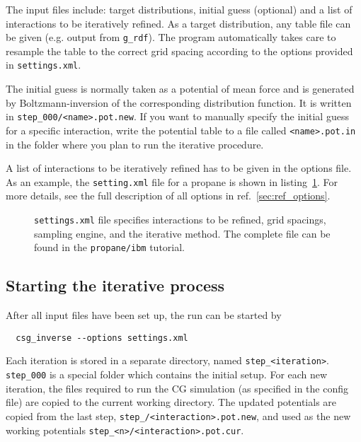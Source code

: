 The input files include: target distributions, initial guess (optional) and a list of interactions to be iteratively refined. As a target distribution, any table file can be given (e.g. \gromacs output from \texttt{g\_rdf}). The program automatically takes care to resample the table to the correct grid spacing according to the options provided in \texttt{settings.xml}.

The initial guess is normally taken as a potential of mean force and is generated by Boltzmann-inversion of the corresponding distribution function. It is written in \texttt{step\_000/<name>.pot.new}. If you want to manually specify the initial guess for a specific interaction, write the potential table to a file called \texttt{<name>.pot.in} in the folder where you plan to run the iterative procedure.

A list of interactions to be iteratively refined has to be given in the options file. As an example, the \texttt{setting.xml} file for a propane is shown in listing~\ref{list:settings}. For more details,  see the full description of all options in ref.~\ref{sec:ref_options}.
\begin{figure}
\centering
\framebox[\textwidth]{
}
\caption{\texttt{settings.xml} file specifies interactions to be refined, grid spacings, sampling engine, and the iterative method. The complete file can be found in the \texttt{propane/ibm} tutorial. 
\label{list:settings}
}
\end{figure}

\subsection{Starting the iterative process}
\label{sec:starting_iterative_process}
After all input files have been set up, the run can be started by
\begin{verbatim}
  csg_inverse --options settings.xml
\end{verbatim}

Each iteration is stored in a separate directory, named \texttt{step\_<iteration>}. \texttt{step\_000} is a special folder which contains the initial setup. For each new iteration, the files required to run the CG simulation (as specified in the config file) are copied to the current working directory. The updated potentials  are copied from the last step, \texttt{step\_<n-1>/<interaction>.pot.new}, and used as the new working potentials \texttt{step\_<n>/<interaction>.pot.cur}.


